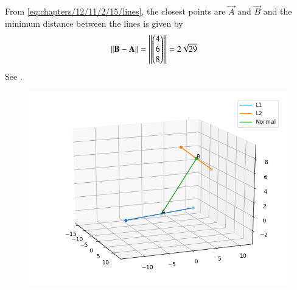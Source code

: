 From \eqref{eq:chapters/12/11/2/15/lines}, 
the closest points are $\vec{A}$  and $\vec{B}$ and  
the minimum distance between the lines is given by
\begin{align}
\left\lVert\mathbf{B}-\mathbf{A}\right\rVert &= \left\lVert\begin{pmatrix}4\\6\\8\end{pmatrix}\right\rVert
= 2\sqrt{29}
\end{align}
%
See .
\begin{figure}[!ht]
\centering
\includegraphics[width=\columnwidth]{chapters/12/11/2/15/figs/Figure_1.png}
\caption{}
\label{fig:chapters/12/11/2/15/}
\end{figure}

